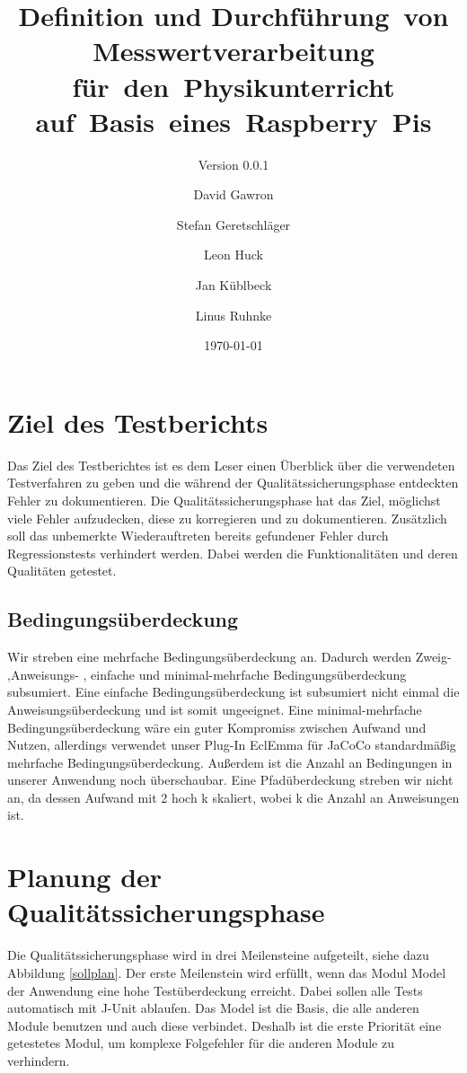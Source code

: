 \documentclass[parskip=full]{scrartcl}
\title{Definition und Durchführung~von Messwertverarbeitung für~den~Physikunterricht auf~Basis~eines~Raspberry~Pis}
\subtitle{Version 0.0.1}
\author{David Gawron \and Stefan Geretschläger \and Leon Huck \and Jan Küblbeck \and Linus Ruhnke}
\date{\today}
\begin{document}
\maketitle

\clearpage
\tableofcontents 					%

\clearpage
\section{Ziel des Testberichts} \label{einleitung}

Das Ziel des Testberichtes ist es dem Leser einen Überblick über die verwendeten Testverfahren zu geben und die während der Qualitätssicherungsphase entdeckten Fehler zu dokumentieren. Die Qualitätssicherungsphase hat das Ziel, möglichst viele Fehler aufzudecken, diese zu korregieren und zu dokumentieren. Zusätzlich soll das unbemerkte Wiederauftreten bereits gefundener Fehler durch Regressionstests verhindert werden. Dabei werden die Funktionalitäten und deren Qualitäten getestet.


\subsection{Bedingungsüberdeckung}
Wir streben eine mehrfache Bedingungsüberdeckung an. Dadurch werden Zweig- ,Anweisungs- , einfache und minimal-mehrfache Bedingungsüberdeckung subsumiert. Eine einfache Bedingungsüberdeckung ist subsumiert nicht einmal die Anweisungsüberdeckung und ist somit ungeeignet. Eine minimal-mehrfache Bedingungsüberdeckung wäre ein guter Kompromiss zwischen Aufwand und Nutzen, allerdings verwendet unser Plug-In \gls{EclEmma} für \gls{JaCoCo} standardmäßig mehrfache Bedingungsüberdeckung. Außerdem ist die Anzahl an Bedingungen in unserer Anwendung noch überschaubar.
Eine Pfadüberdeckung streben wir nicht an, da dessen Aufwand mit 2 hoch k skaliert, wobei k die Anzahl an Anweisungen ist. 

\clearpage
\section{Planung der Qualitätssicherungsphase} \label{planung}

Die Qualitätssicherungsphase wird in drei Meilensteine aufgeteilt, siehe dazu Abbildung \ref{sollplan}. Der erste Meilenstein wird erfüllt, wenn das Modul Model der Anwendung eine hohe Testüberdeckung erreicht. Dabei sollen alle Tests automatisch mit J-Unit ablaufen. Das Model ist die Basis, die alle anderen Module benutzen und auch diese verbindet. Deshalb ist die erste Priorität eine getestetes Modul, um komplexe Folgefehler für die anderen Module zu verhindern. 
\end{document}
